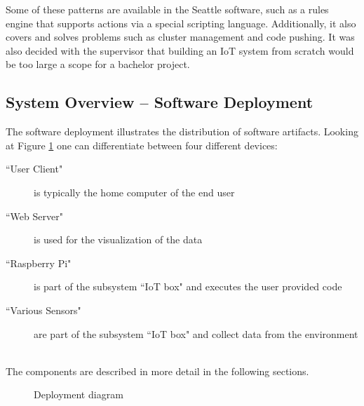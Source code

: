 \documentclass{article}      %
\begin{document}
Some of these patterns are available in the Seattle software, such as a rules engine that supports actions via a special scripting language. Additionally, it also covers and solves problems such as cluster management and code pushing. It was also decided with the supervisor that building an \gls{IoT} system from scratch would be too large a scope for a bachelor project.

\subsection{System Overview -- Software Deployment}

The software deployment illustrates the distribution of software artifacts. Looking at Figure \ref{fig:deployment} one can 
differentiate between four different devices: 
\\
\begin{description}
	\item[``User Client"]
	is typically the home computer of the end user
	\item[``Web Server"]
	is used for the visualization of the data
	\item[``Raspberry Pi"]
	is part of the subsystem ``\gls{IoT} box" and executes the user provided code 
	\item[``Various Sensors"]
	are part of the subsystem ``\gls{IoT} box" and collect data from the environment
\end{description}

\noindent
\\The components are described in more detail in the following sections.

\begin{figure}[ht]
	\caption{Deployment diagram}
	\label{fig:deployment}
\end{figure}
\end{document}
